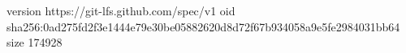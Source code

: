 version https://git-lfs.github.com/spec/v1
oid sha256:0ad275fd2f3e1444e79e30be05882620d8d72f67b934058a9e5fe2984031bb64
size 174928
